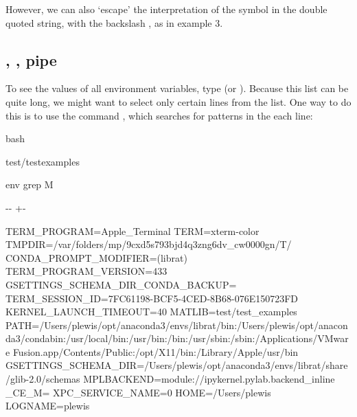 \documentclass[letterpaper,10pt,english]{sphinxmanual}
\newlength\nbsphinxcodecellspacing
\begin{document}
However, we can also ‘escape’ the interpretation of the \sphinxcode{\sphinxupquote{\$}} symbol in the double quoted string, with the backslash  \sphinxcode{\sphinxupquote{\textbackslash{}}}, as in example 3.


\subsection{, , pipe \sphinxstyleliteralintitle{\sphinxupquote{|}}}
\label{\detokenize{Appendix1:env,-grep,-pipe-|}}
To see the values of all environment variables, type  (or ). Because this list can be quite long, we might want to select only certain lines from the list. One way to do this is to use the command , which searches for patterns in the each line:

{
\begin{sphinxVerbatim}[commandchars=\\\{\}]
\llap{\color{nbsphinxin}[3]:\,\hspace{\fboxrule}\hspace{\fboxsep}}\PYGZpc{}\PYGZpc{}bash

 test/test\PYGZus{}examples

env  grep M
\end{sphinxVerbatim}
}

{

\kern-\sphinxverbatimsmallskipamount\kern-\baselineskip
\kern+\FrameHeightAdjust\kern-\fboxrule
\vspace{\nbsphinxcodecellspacing}

\begin{sphinxVerbatim}[commandchars=\\\{\}]
TERM\_PROGRAM=Apple\_Terminal
TERM=xterm-color
TMPDIR=/var/folders/mp/9cxd5s793bjd4q3zng6dv\_cw0000gn/T/
CONDA\_PROMPT\_MODIFIER=(librat)
TERM\_PROGRAM\_VERSION=433
GSETTINGS\_SCHEMA\_DIR\_CONDA\_BACKUP=
TERM\_SESSION\_ID=7FC61198-BCF5-4CED-8B68-076E150723FD
KERNEL\_LAUNCH\_TIMEOUT=40
MATLIB=test/test\_examples
PATH=/Users/plewis/opt/anaconda3/envs/librat/bin:/Users/plewis/opt/anaconda3/condabin:/usr/local/bin:/usr/bin:/bin:/usr/sbin:/sbin:/Applications/VMware Fusion.app/Contents/Public:/opt/X11/bin:/Library/Apple/usr/bin
GSETTINGS\_SCHEMA\_DIR=/Users/plewis/opt/anaconda3/envs/librat/share/glib-2.0/schemas
MPLBACKEND=module://ipykernel.pylab.backend\_inline
\_CE\_M=
XPC\_SERVICE\_NAME=0
HOME=/Users/plewis
LOGNAME=plewis
\end{sphinxVerbatim}
}
\end{document}
